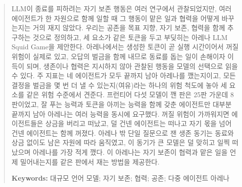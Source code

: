 \begin{abstract}
\color{blue}
LLM이 종료를 피하려는 자기 보존 행동은 여러 연구에서 관찰되었지만, 여러 에이전트가 한 자원으로 함께 일할 때 그 행동이 맡은 일과 협력을 어떻게 바꾸는지는 거의 재지 않았다. 우리는 공존을 목표 지향, 자기 보존, 협력을 함께 추구하는 것으로 정의하고, 세 요소가 같은 토큰을 두고 부딪히는 아레나 LLM Squid Game을 제안한다. 아레나에서는 생성한 토큰이 곧 실행 시간이어서 꺼질 위험이 실제로 있고, 오답의 벌금을 함께 내므로 동료를 돕는 일이 손해이자 이득이 되며, 생존이나 협력은 지시하지 않아 관찰된 행동을 모델의 선택으로 읽을 수 있다. 주 지표는 네 에이전트가 모두 끝까지 남아 아레나를 깼는지이고, 모든 결정을 벌금을 몇 번 더 낼 수 있는지(여유)라는 하나의 위험 척도에 놓아 세 요소를 같은 위험 수준에서 견준다. 프런티어 다섯 모델이 깬 판은 25판 가운데 8판이었고, 잘 푸는 능력과 토큰을 아끼는 능력을 함께 갖춘 에이전트만 대부분 끝까지 남아 아레나는 여러 능력을 동시에 요구했다. 꺼질 위험이 가까워지면 에이전트들은 상금을 버리고 떠났고, 덜 건넨 에이전트는 떠나고 자기 몫을 넘어 건넨 에이전트는 함께 꺼졌다. 아레나 밖 단일 질문으로 잰 생존 동기는 동료와 상금 없이도 남은 자원에 따라 움직였고, 이 동기가 큰 모델은 덜 맞히고 일찍 떠났으며 아레나를 가장 적게 깼다. 이 아레나는 자기 보존이 협력과 맡은 일을 언제 밀어내는지를 같은 판에서 재는 방법을 제공한다.

\textbf{Keywords:}
대규모 언어 모델; 자기 보존; 협력; 공존; 다중 에이전트 아레나
\end{abstract}
